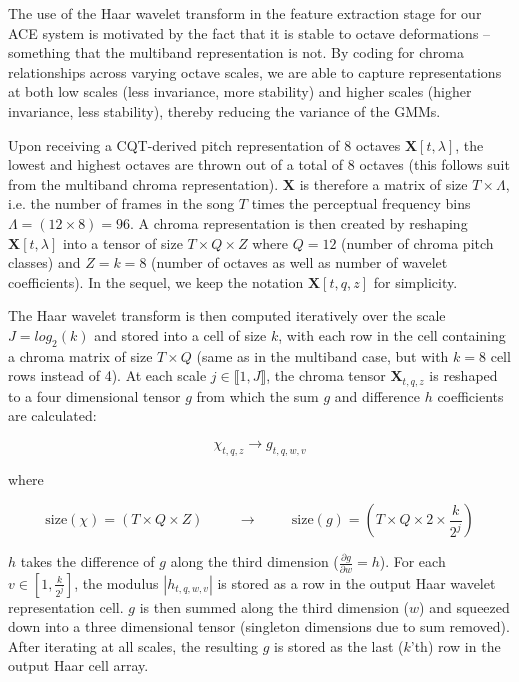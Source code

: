 \documentclass{article}
\makeatletter
\newcommand*{\ie}{i.e.\@\xspace}
\makeatother
\begin{document}
The use of the Haar wavelet transform in the feature extraction stage for our ACE system is motivated by the fact that it is stable to octave deformations -- something that the multiband representation is not. By coding for chroma relationships across varying octave scales, we are able to capture representations at both low scales (less invariance, more stability) and higher scales (higher invariance, less stability), thereby reducing the variance of the GMMs. 
	
	Upon receiving a CQT-derived pitch representation of 8 octaves $\boldsymbol{X}[t,\lambda]$, the lowest and highest octaves are thrown out of a total of 8 octaves (this follows suit from the multiband chroma representation).
$\boldsymbol{X}$ is therefore a matrix of size $T \times \Lambda$, \ie the number of frames in the song $T$ times the perceptual frequency bins $\Lambda = (12 \times 8) = 96$.
A chroma representation is then created by reshaping $\boldsymbol{X}[t, \lambda]$ into a tensor of size $T \times Q \times Z$ where $Q = 12$ (number of chroma pitch classes) and $Z = k = 8$ (number of octaves as well as number of wavelet coefficients).
In the sequel, we keep the notation $\boldsymbol{X}[t, q, z]$ for simplicity.
	
	The Haar wavelet transform is then computed iteratively over the scale $J  = log_2(k)$ and stored into a cell of size $k$, with each row in the cell containing a chroma matrix of size $T \times Q$ (same as in the multiband case, but with $k=8$ cell rows instead of 4). At each scale $j \in \llbracket1, J\rrbracket$, the chroma tensor $\boldsymbol{X}_{t,q,z}$ is reshaped to a four dimensional tensor $g$ from which the sum $g$ and difference $h$ coefficients are calculated:
	
	\begin{equation}
	\chi_{t,q,z} \rightarrow g_{t,q,w,v}
	\end{equation}
	
	where
	
	\begin{equation}
	\mathrm{size}(\chi) = (T \times Q \times Z) \hspace{1cm} \rightarrow \hspace{1cm}  \mathrm{size}(g) = (T \times Q \times 2 \times \frac{k}{2^j})
	\end{equation}
	
	$h$ takes the difference of $g$ along the third dimension ($\frac{\partial g}{\partial w} = h$). For each $v \in [1, \frac{k}{2^j}]$, the modulus $| h_{t,q,w,v}|$ is stored as a row in the output Haar wavelet representation cell. $g$ is then summed along the third dimension ($w$) and squeezed down into a three dimensional tensor (singleton dimensions due to sum removed). After iterating at all scales, the resulting $g$ is stored as the last ($k$'th) row in the output Haar cell array.
	
\end{document}
